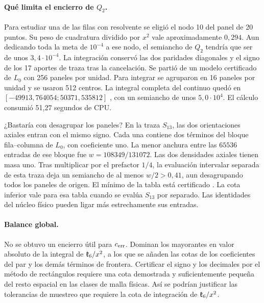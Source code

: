 \paragraph{Qué limita el encierro de $Q_2$.}
Para estudiar una de las filas con resolvente se eligió el nodo 10 del panel de 20 puntos. Su
peso de cuadratura dividido por $x^2$ vale aproximadamente $0{,}294$. Aun dedicando toda la meta
de $10^{-4}$ a ese nodo, el semiancho de $Q_2$ tendría que ser de unos $3{,}4\cdot10^{-4}$.
La integración conservó las dos paridades diagonales y el signo de los 17 aportes de traza tras
la cancelación. Se partió de un modelo certificado de $L_0$ con 256 paneles por unidad. Para
integrar se agruparon en 16 paneles por unidad y se usaron 512 centros. La integral completa del
continuo quedó en $[-49913{,}764054;50371{,}535812]$ , con un semiancho de unos $5{,}0\cdot10^4$.
El cálculo consumió 51,27 segundos de CPU.

¿Bastaría con desagrupar los paneles? En la traza $S_{13}$, las dos orientaciones
axiales entran con el mismo signo. Cada una contiene dos términos del bloque fila--columna de $L_0$,
con coeficiente uno. La menor anchura entre las $65536$ entradas de ese bloque fue $w=108349/131072$.
Las dos densidades axiales tienen masa uno. Tras multiplicar por el prefactor $1/4$, la evaluación
intervalar separada de esta traza deja un semiancho de al menos $w/2>0{,}41$, aun desagrupando todos
los paneles de origen. El mínimo de la tabla está certificado . La cota inferior  vale
para esa
tabla cuando se
evalúa $S_{13}$ por separado. Las identidades del núcleo físico pueden ligar más estrechamente
sus entradas.

\paragraph{Balance global.}\label{par:balance-global}
No se obtuvo un encierro útil para $c_{\mathrm{err}}$. Dominan los mayorantes en valor absoluto de
la integral de $\mathfrak{k}_6/x^2$, a los que se añaden las cotas de los coeficientes del par
y los demás términos de frontera. Certificar el signo y los decimales por el método de
rectángulos requiere una cota demostrada y suficientemente pequeña
del resto espacial en las clases de malla físicas. Así se podrían justificar las tolerancias de
muestreo que requiere la cota de integración de $\mathfrak{k}_6/x^2$.

